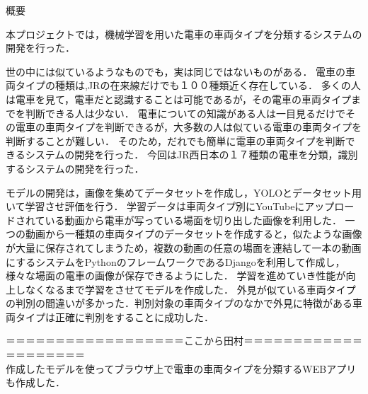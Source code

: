 

\begin{center}
		{\gtfamily \Large 概要}
\end{center}
\vspace{1cm}
\thispagestyle{empty}	



本プロジェクトでは，機械学習を用いた電車の車両タイプを分類するシステムの開発を行った．

世の中には似ているようなものでも，実は同じではないものがある．
電車の車両タイプの種類は,JRの在来線だけでも１００種類近く存在している．
多くの人は電車を見て，電車だと認識することは可能であるが，その電車の車両タイプまでを判断できる人は少ない．
電車についての知識がある人は一目見るだけでその電車の車両タイプを判断できるが，大多数の人は似ている電車の車両タイプを判断することが難しい．
そのため，だれでも簡単に電車の車両タイプを判断できるシステムの開発を行った．
今回はJR西日本の１７種類の電車を分類，識別するシステムの開発を行った．

モデルの開発は，画像を集めてデータセットを作成し，YOLOとデータセット用いて学習させ評価を行う．
学習データは車両タイプ別にYouTubeにアップロードされている動画から電車が写っている場面を切り出した画像を利用した．
一つの動画から一種類の車両タイプのデータセットを作成すると，似たような画像が大量に保存されてしまうため，複数の動画の任意の場面を連結して一本の動画にするシステムをPythonのフレームワークであるDjangoを利用して作成し，様々な場面の電車の画像が保存できるようにした．
学習を進めていき性能が向上しなくなるまで学習をさせてモデルを作成した．
外見が似ている車両タイプの判別の間違いが多かった．判別対象の車両タイプのなかで外見に特徴がある車両タイプは正確に判別をすることに成功した．

＝＝＝＝＝＝＝＝＝＝＝＝＝＝＝＝＝＝ここから田村＝＝＝＝＝＝＝＝＝＝＝＝＝＝＝＝＝＝＝＝\\
作成したモデルを使ってブラウザ上で電車の車両タイプを分類するWEBアプリも作成した．\\

\clearpage
